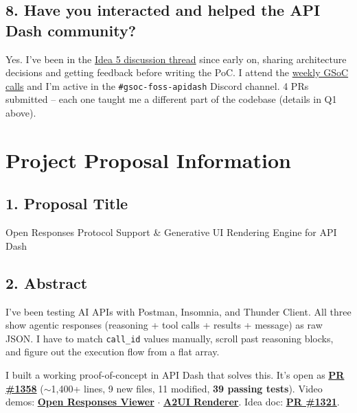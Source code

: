\documentclass[11pt,a4paper]{article}
\begin{document}
\subsection{8. Have you interacted and helped the API Dash community?}

Yes. I've been in the \href{https://github.com/foss42/apidash/discussions/1227}{Idea 5 discussion thread} since early on, sharing architecture decisions and getting feedback before writing the PoC. I attend the \href{https://lu.ma/calendar/cal-ZTW02O2EsWRs6V4}{weekly GSoC calls} and I'm active in the \texttt{\#gsoc-foss-apidash} Discord channel. 4 PRs submitted -- each one taught me a different part of the codebase (details in Q1 above).

\newpage

\section{Project Proposal Information}

\subsection{1. Proposal Title}

Open Responses Protocol Support \& Generative UI Rendering Engine for API Dash

\subsection{2. Abstract}

I've been testing AI APIs with Postman, Insomnia, and Thunder Client. All three show agentic responses (reasoning + tool calls + results + message) as raw JSON. I have to match \texttt{call\_id} values manually, scroll past reasoning blocks, and figure out the execution flow from a flat array.

I built a working proof-of-concept in API Dash that solves this. It's open as \href{https://github.com/foss42/apidash/pull/1358}{\textbf{PR \#1358}} ($\sim$1,400+ lines, 9 new files, 11 modified, \textbf{39 passing tests}). Video demos: \href{https://youtu.be/paN-KGIhNms}{\textbf{Open Responses Viewer}} $\cdot$ \href{https://youtu.be/T2KbHth736U}{\textbf{A2UI Renderer}}. Idea doc: \href{https://github.com/foss42/apidash/pull/1321}{\textbf{PR \#1321}}.
\end{document}
